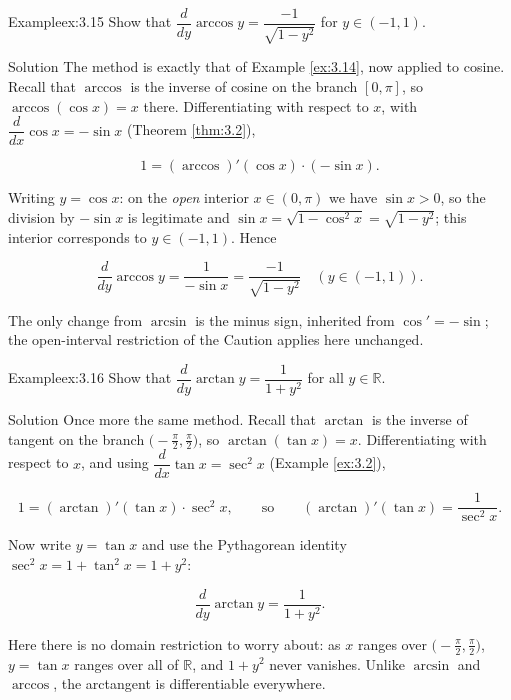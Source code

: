 \documentclass[a4paper,12pt,oneside]{memoir}
\begin{document}
\begin{workedexample}
\begin{envexample}{Example}{ex:3.15}{}
Show that \(\dfrac{d}{dy}\arccos y = \dfrac{-1}{\sqrt{1 - y^{2}}}\) for \(y \in (-1, 1)\).
\end{envexample}
\begin{envsolution}{Solution}{}{}
The method is exactly that of Example \ref{ex:3.14}, now applied to cosine. Recall that \(\arccos\) is the inverse of cosine on the branch \([0, \pi]\), so \(\arccos(\cos x) = x\) there. Differentiating with respect to \(x\), with \(\dfrac{d}{dx}\cos x = -\sin x\) (Theorem \ref{thm:3.2}),

\[ 1 = (\arccos)'(\cos x)\cdot(-\sin x). \]

Writing \(y = \cos x\): on the \emph{open} interior \(x \in (0, \pi)\) we have \(\sin x > 0\), so the division by \(-\sin x\) is legitimate and \(\sin x = \sqrt{1 - \cos^{2} x} = \sqrt{1 - y^{2}}\); this interior corresponds to \(y \in (-1, 1)\). Hence

\[ \frac{d}{dy}\arccos y = \frac{1}{-\sin x} = \frac{-1}{\sqrt{1 - y^{2}}} \quad (y \in (-1, 1)). \]

The only change from \(\arcsin\) is the minus sign, inherited from \(\cos' = -\sin\); the open-interval restriction of the Caution applies here unchanged.
\end{envsolution}
\end{workedexample}
\begin{workedexample}
\begin{envexample}{Example}{ex:3.16}{}
Show that \(\dfrac{d}{dy}\arctan y = \dfrac{1}{1 + y^{2}}\) for all \(y \in \mathbb{R}\).
\end{envexample}
\begin{envsolution}{Solution}{}{}
Once more the same method. Recall that \(\arctan\) is the inverse of tangent on the branch \(\bigl(-\tfrac{\pi}{2}, \tfrac{\pi}{2}\bigr)\), so \(\arctan(\tan x) = x\). Differentiating with respect to \(x\), and using \(\dfrac{d}{dx}\tan x = \sec^{2} x\) (Example \ref{ex:3.2}),

\[ 1 = (\arctan)'(\tan x)\cdot\sec^{2} x, \qquad\text{so}\qquad (\arctan)'(\tan x) = \frac{1}{\sec^{2} x}. \]

Now write \(y = \tan x\) and use the Pythagorean identity \(\sec^{2} x = 1 + \tan^{2} x = 1 + y^{2}\):

\[ \frac{d}{dy}\arctan y = \frac{1}{1 + y^{2}}. \]

Here there is no domain restriction to worry about: as \(x\) ranges over \(\bigl(-\tfrac{\pi}{2}, \tfrac{\pi}{2}\bigr)\), \(y = \tan x\) ranges over all of \(\mathbb{R}\), and \(1 + y^{2}\) never vanishes. Unlike \(\arcsin\) and \(\arccos\), the arctangent is differentiable everywhere.
\end{envsolution}
\end{workedexample}
\end{document}
